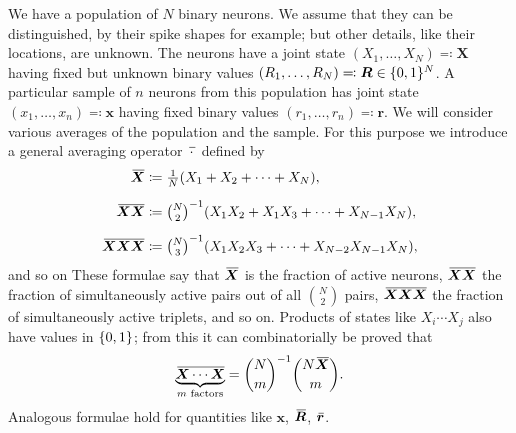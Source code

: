 \documentclass{article}
\theoremstyle{remark}
\theoremstyle{innote}
\newcommand*{\defd}{\coloneqq}
\newcommand*{\defs}{\eqqcolon}
\renewcommand*{\|}{\mathpunct{|}}%
\newcommand*{\dotv}{\mathord{\,\cdot\,}}%
\DeclarePairedDelimiter\set{\{}{\}}
\theoremstyle{simple}
\newtheorem*{simplenote}{}
\newcommand*{\puzzle}{{\fontencoding{U}\fontfamily{fontawesometwo}\selectfont\symbol{225}}}
\newcommand{\mynote}[1]{ {\color{notecolour}\puzzle\ #1}}
\newcommand*{\widebar}[1]{{\mkern1.5mu\skew{2}\overline{\mkern-1.5mu#1\mkern-1.5mu}\mkern 1.5mu}}
\newcommand*{\av}{\widebar} %
\newcommand*{\sav}{\widebar} %
\newcommand*{\yxx}{x}%
\newcommand*{\yx}{\bm{\yxx}}%
\newcommand*{\yX}{\bm{X}}%
\newcommand*{\yXf}{\av{\yX}}%
\newcommand*{\yXXf}{\av{\yX\yX}}%
\newcommand*{\yr}{\bm{r}}%
\newcommand*{\yrs}{\sav{\yr}}%
\newcommand*{\yR}{\bm{R}}%
\newcommand*{\yRf}{\av{\yR}}%
\begin{document}
We have a population of $N$ binary neurons. We assume that they can be
distinguished, by their spike shapes for example; but other details, like
their locations, are unknown. The neurons have a joint state
$(X_1,\dotsc,X_N) \defs \yX$ having fixed but unknown binary values
$(R_1,\dotsc,R_N)\defs \yR \in \set{0,1}^N$. A particular sample of $n$
neurons from this population has joint state $(x_1, \dotsc, x_n) \defs \yx$
having fixed binary values $(r_1, \dotsc, r_n)\defs\yr$. We will consider
various averages of the population and the sample. For this purpose we
introduce a general averaging operator $\sav{\dotv}$ defined by
\begin{align}
  \av{\yX}  &\defd \tfrac{1}{N} (X_1 + X_2 + \dotsb + X_N),
    \\[2\jot]
  \av{\yX \yX} &\defd
\tbinom{N}{2}^{-1} (X_1 X_2 + X_1 X_3  + \dotsb +  X_{N-1} X_N),
\\[2\jot]
\av{\yX\yX\yX} &\defd
                  \tbinom{N}{3}^{-1}
                  (X_1 X_2 X_3 +%
                   \dotsb + X_{N-2} X_{N-1}X_N),
\end{align}
and so on
These formulae say that $\yXf$ is the fraction of active neurons, $\yXXf$
the fraction of simultaneously active pairs out of all $\binom{N}{2}$
pairs, $\av{\yX\yX\yX}$ the fraction of simultaneously active triplets, and
so on. Products of states like $X_i \dotsm X_j$ also have values in
$\set{0,1}$; from this it can combinatorially be proved that
\begin{equation}
  \label{eq:products_intermsof_average}
  \av{\underbrace{\yX\dotsm\yX}_{\text{$m$ factors}}}
  = \binom{N}{m}^{-1}\binom{N\yXf}{m}.
\end{equation}
Analogous formulae  hold for quantities like $\yx$, $\yRf$, $\yrs$.

\end{document}
